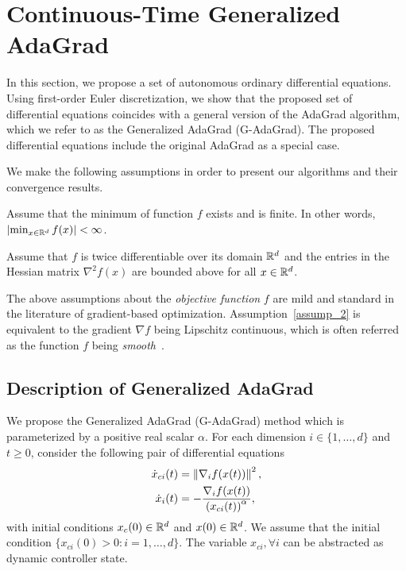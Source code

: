 \section{Continuous-Time Generalized AdaGrad}
\label{sec:adagrad}

In this section, we propose a set of autonomous ordinary differential equations. Using first-order Euler discretization, we show that the proposed set of differential equations coincides with a general version of the AdaGrad algorithm, which we refer to as the Generalized AdaGrad (G-AdaGrad). The proposed differential equations include the original AdaGrad as a special case.

We make the following assumptions in order to present our algorithms and their convergence results.

\begin{assumption} \label{assump_1}
Assume that the minimum of function $f$ exists and is finite. In other words, $\left\lvert\min_{x \in \mathbb{R}^d} f(x)\right\rvert < \infty$.
\end{assumption}

\begin{assumption} \label{assump_2}
Assume that $f$ is twice differentiable over its domain $\mathbb{R}^d$ and the entries in the Hessian matrix $\nabla^2 f(x)$ are bounded above for all $x\in \mathbb{R}^d$.
\end{assumption}

The above assumptions about the {\em objective function} $f$ are mild and standard in the literature of gradient-based optimization. Assumption~\ref{assump_2} is equivalent to the gradient $\nabla f$ being Lipschitz continuous, which is often referred as the function $f$ being {\em smooth}~\cite{li2019convergence, reddi2018adaptive,de2018convergence}.


\subsection{Description of Generalized AdaGrad}
\label{sub:algo_adagrad}

We propose the Generalized AdaGrad (G-AdaGrad) method which is parameterized by a positive real scalar $\alpha$.
For each dimension $i \in \{1,\ldots,d\}$ and $t \geq 0$, consider the following pair of differential equations
\begin{align}
    \Dot{x}_{ci}(t) & = \left\lVert\nabla_i f(x(t))\right\rVert ^2, \label{eqn:xc_evol} \\
    \Dot{x}_i(t) & = -\dfrac{\nabla_i f(x(t))}{\left(x_{ci}(t)\right)^\alpha},  \label{eqn:x_evol}
\end{align}
with initial conditions $x_c(0) \in \mathbb{R}^d$ and $x(0) \in \mathbb{R}^d$. We assume that the initial condition $\{x_{ci}(0) > 0 : i = 1,\ldots,d\}$.  The variable ${x}_{ci}, \forall i$ can be abstracted as dynamic controller state. 

